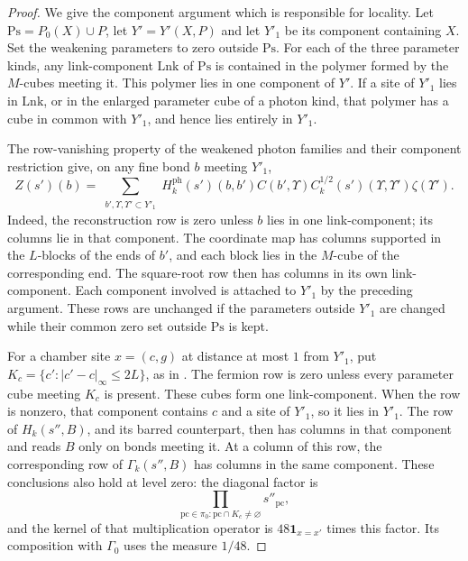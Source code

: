 \documentclass[11pt,letterpaper,reqno]{amsart}
\begin{document}
\begin{proof}
We give the component argument which is responsible for
locality. Let $\mathrm{Ps}=P_0(X)\cup P$, let
$Y'=Y'(X,P)$ and let $Y'_1$ be its component containing $X$.
Set the weakening parameters to zero outside $\mathrm{Ps}$.
For each of the three parameter kinds, any link-component
$\mathrm{Lnk}$ of $\mathrm{Ps}$ is contained in the polymer
formed by the $M$-cubes meeting it. This polymer lies in one
component of $Y'$. If a site of $Y'_1$ lies in $\mathrm{Lnk}$,
or in the enlarged parameter cube of a photon kind, that
polymer has a cube in common with $Y'_1$, and hence lies
entirely in $Y'_1$.

The row-vanishing property of the weakened photon families
and their component restriction give, on any fine bond $b$
meeting $Y'_1$,
\begin{equation}\label{eq:rgnl-restricted-photon}
 Z(s')(b)=
  \sum_{\substack{b',\Upsilon,\Upsilon'\subset Y'_1}}
   H_k^{\mathrm{ph}}(s')(b,b')C(b',\Upsilon)
          C_k^{1/2}(s')(\Upsilon,\Upsilon')\zeta(\Upsilon').
\end{equation}
Indeed, the reconstruction row is zero unless $b$ lies in
one link-component; its columns lie in that component.
The coordinate map has columns supported in the $L$-blocks
of the ends of $b'$, and each block lies in the $M$-cube of
the corresponding end. The square-root row then has columns
in its own link-component. Each component involved is
attached to $Y'_1$ by the preceding argument.
These rows are unchanged if the parameters outside $Y'_1$
are changed while their common zero set outside $\mathrm{Ps}$
is kept.

For a chamber site $x=(c,g)$ at distance at most $1$ from
$Y'_1$, put $K_c=\{c':|c'-c|_\infty\le2L\}$, as in
\cite[Proposition~4.1]{FermionBlockManuscript}.
The fermion row is zero unless every parameter cube
meeting $K_c$ is present. These cubes form one
link-component. When the row is nonzero, that component
contains $c$ and a site of $Y'_1$, so it lies in $Y'_1$.
The row of $H_k(s'',B)$, and its barred counterpart,
then has columns in that component and reads $B$ only on
bonds meeting it. At a column of this row, the corresponding
row of $\Gamma_k(s'',B)$ has columns in the same component.
These conclusions also hold at level zero: the diagonal
factor is
\[
 \prod_{\mathrm{pc}\in\pi_0:\mathrm{pc}\cap K_c\ne\varnothing}
                                                       s''_{\mathrm{pc}},
\]
and the kernel of that multiplication operator is
$48\mathbf1_{x=x'}$ times this factor. Its composition with
$\Gamma_0$ uses the measure $1/48$.


\end{proof}
\end{document}

